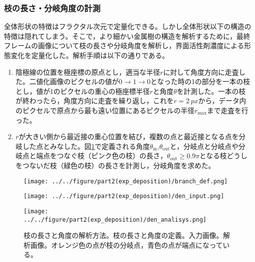 \documentclass[autodetect-engine,dvi=dvipdfmx,a4paper,ja=standard,oneside,openany,11pt]{bxjsbook}
\begin{document}
\subsubsection{枝の長さ・分岐角度の計測}
全体形状の特徴はフラクタル次元で定量化できる。しかし全体形状以下の構造の特徴は隠れてしまう。そこで，より細かい金属樹の構造を解析するために，最終フレームの画像について枝の長さや分岐角度を解析し，界面活性剤濃度による形態変化を定量化した。解析手順は以下の通りである。
\begin{enumerate}
  \item 陰極線の位置を極座標の原点とし，適当な半径$r$に対して角度方向に走査した。二値化画像のピクセルの値が$0\rightarrow1\rightarrow0$となった時の1の部分を一本の枝とし，値が1のピクセルの重心の極座標半径$r$と角度$\theta$を計測した。一本の枝が終わったら，角度方向に走査を繰り返し，これを$r=\SI{2}{px}$から，データ内のピクセルで原点から最も遠い位置にあるピクセルの半径$r_{\mathrm{max}}$まで走査を行った。
  \item $r$が大きい側から最近接の重心位置を結び，複数の点と最近接となる点を分岐した点とみなした。図\ref{fig:branch_def_input}で定義される角度$\theta_{\mathrm{in}}$,$\theta_{\mathrm{out}}$と，分岐点と分岐点や分岐点と端点をつなぐ枝（ピンク色の枝）の長さ，$\theta_{\mathrm{out}}\geq 0.9\pi$となる枝どうしをつないだ枝（緑色の枝）の長さを計測し，分岐角度を求めた。
\end{enumerate}

\begin{figure}
  \begin{minipage}
    {0.32\textwidth}
    \subcaption{}
    \centering
    \texttt{[image: ../../figure/part2(exp\_deposition)/branch\_def.png]}
    \label{fig:branch_def}
  \end{minipage}
  \begin{minipage}
    {0.32\textwidth}
    \subcaption{}
    \centering
    \texttt{[image: ../../figure/part2(exp\_deposition)/den\_input.png]}
    \label{fig:den_input}
  \end{minipage}
  \begin{minipage}
    {0.32\textwidth}
    \subcaption{}
    \centering
    \texttt{[image: ../../figure/part2(exp\_deposition)/den\_analisys.png]}
    \label{fig:den_analisys}
  \end{minipage}
  \caption{枝の長さと角度の解析方法。枝の長さと角度の定義。入力画像。解析画像。オレンジ色の点が枝の分岐点，青色の点が端点になっている。}
  \label{fig:branch_def_input}
\end{figure}
\end{document}
